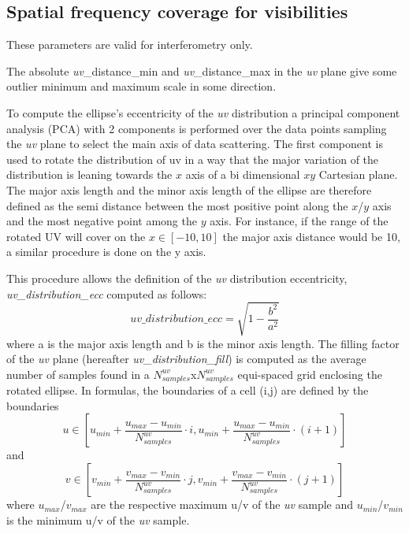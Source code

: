 \documentclass[11pt,a4paper]{ivoa}
\begin{document}

\subsection{Spatial frequency coverage for visibilities  }
These parameters are valid for interferometry only.

The absolute \emph{uv}\_distance\_min and \emph{uv}\_distance\_max  in the \emph{uv} plane give some outlier minimum and maximum scale in some direction.

To compute the ellipse's eccentricity of the \emph{uv} distribution a principal component analysis
(PCA) with 2 components is performed over the data points sampling the \emph{uv} plane to select the
main axis of data scattering. 
The first component is used to rotate the distribution of uv in a way that the major variation
of the distribution is leaning towards the $x$ axis of a bi dimensional $xy$ Cartesian plane.
The major axis length and the minor axis length of the ellipse are therefore defined as the
semi distance between the most positive point along the $x$/$y$ axis and the most negative point
among the $y$ axis. For instance, if the range of the rotated UV will cover on the $x \in [-10,
10]$ the major axis distance would be 10, a similar procedure is done on the y axis.

This procedure allows the definition of the \emph{uv} distribution eccentricity, \emph{uv\_distribution\_ecc} computed as follows:
\begin{equation}
uv\_distribution\_ecc = \sqrt{1-\frac{b^2}{a^2}}
\end{equation}
where a is the major axis length and b is the minor axis length.
The filling factor of the \emph{uv} plane (hereafter \emph{uv\_distribution\_fill}) is computed as the average
number of samples found in a $N^{uv}_{samples}$x$N^{uv}_{samples}$ equi-spaced grid enclosing the
rotated ellipse. In formulas, the boundaries of a cell (i,j) are defined by the boundaries
\begin{equation}
u \in [u_{min} + \frac{u_{max} - u_{min}}{N^{uv}_{samples}} \cdot i , u_{min} + \frac{u_{max} -
u_{min}}{N^{uv}_{samples}} \cdot (i + 1)]
\end{equation}
and
\begin{equation}
v \in [v_{min} + \frac{v_{max} - v_{min}}{N^{uv}_{samples}} \cdot j , v_{min} + \frac{v_{max} -
v_{min}}{N^{uv}_{samples}} \cdot (j + 1)]
\end{equation}
where $u_{max}$/$v_{max}$ are the respective maximum u/v of the \emph{uv} sample and
$u_{min}$/$v_{min}$ is the minimum u/v of the \emph{uv} sample.
\end{document}
